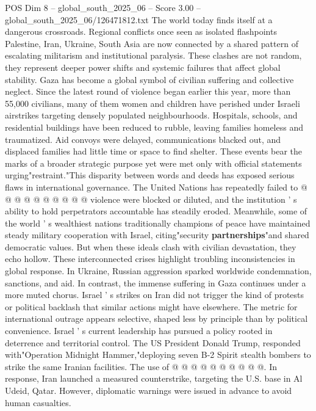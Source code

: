 \begin{textsample}{POS Dim 8 – global\_south\_2025\_06 – Score 3.00 – global\_south\_2025\_06/126471812.txt}  \label{ex:f8_pos_198}
The world today finds itself at a dangerous crossroads.
Regional conflicts once seen as isolated flashpoints Palestine, Iran, Ukraine, South Asia are now connected by a shared pattern of escalating militarism and institutional paralysis.
These clashes are not random, they represent deeper power shifts and systemic failures that affect global stability.
Gaza has become a global symbol of civilian suffering and collective neglect.
Since the latest round of violence began earlier this year, more than 55,000 civilians, many of them women and children have perished under Israeli airstrikes targeting densely populated neighbourhoods.
Hospitals, schools, and residential buildings have been reduced to rubble, leaving families homeless and traumatized.
Aid convoys were delayed, communications blacked out, and displaced families had little time or space to find shelter.
These events bear the marks of a broader strategic purpose yet were met only with official statements urging"restraint."This disparity between words and deeds has exposed serious flaws in international governance.
The United Nations has repeatedly failed to @ @ @ @ @ @ @ @ @ @ violence were blocked or diluted, and the institution ' s ability to hold perpetrators accountable has steadily eroded.
Meanwhile, some of the world ' s wealthiest nations traditionally champions of peace have maintained steady military cooperation with Israel, citing"security \textbf{partnerships}"and shared democratic values.
But when these ideals clash with civilian devastation, they echo hollow.
These interconnected crises highlight troubling inconsistencies in global response.
In Ukraine, Russian aggression sparked worldwide condemnation, sanctions, and aid.
In contrast, the immense suffering in Gaza continues under a more muted chorus.
Israel ' s strikes on Iran did not trigger the kind of protests or political backlash that similar actions might have elsewhere.
The metric for international outrage appears selective, shaped less by principle than by political convenience.
Israel ' s current leadership has pursued a policy rooted in deterrence and territorial control.
The US President Donald Trump, responded with"Operation Midnight Hammer,"deploying seven B-2 Spirit stealth bombers to strike the same Iranian facilities.
The use of @ @ @ @ @ @ @ @ @ @.
In response, Iran launched a measured counterstrike, targeting the U.S. base in Al Udeid, Qatar.
However, diplomatic warnings were issued in advance to avoid human casualties.

\end{textsample}
